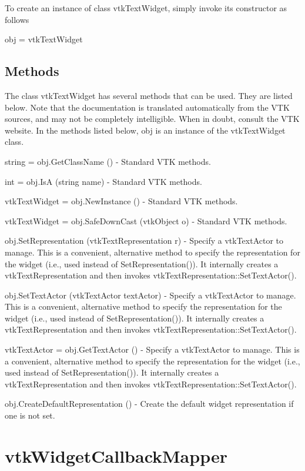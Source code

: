 To create an instance of class vtk\-Text\-Widget, simply invoke its constructor as follows \begin{DoxyVerb}  obj = vtkTextWidget
\end{DoxyVerb}
 \hypertarget{vtkwidgets_vtkxyplotwidget_Methods}{}\subsection{Methods}\label{vtkwidgets_vtkxyplotwidget_Methods}
The class vtk\-Text\-Widget has several methods that can be used. They are listed below. Note that the documentation is translated automatically from the V\-T\-K sources, and may not be completely intelligible. When in doubt, consult the V\-T\-K website. In the methods listed below, {\ttfamily obj} is an instance of the vtk\-Text\-Widget class. 
\begin{DoxyItemize}
\item {\ttfamily string = obj.\-Get\-Class\-Name ()} -\/ Standard V\-T\-K methods.  
\item {\ttfamily int = obj.\-Is\-A (string name)} -\/ Standard V\-T\-K methods.  
\item {\ttfamily vtk\-Text\-Widget = obj.\-New\-Instance ()} -\/ Standard V\-T\-K methods.  
\item {\ttfamily vtk\-Text\-Widget = obj.\-Safe\-Down\-Cast (vtk\-Object o)} -\/ Standard V\-T\-K methods.  
\item {\ttfamily obj.\-Set\-Representation (vtk\-Text\-Representation r)} -\/ Specify a vtk\-Text\-Actor to manage. This is a convenient, alternative method to specify the representation for the widget (i.\-e., used instead of Set\-Representation()). It internally creates a vtk\-Text\-Representation and then invokes vtk\-Text\-Representation\-::\-Set\-Text\-Actor().  
\item {\ttfamily obj.\-Set\-Text\-Actor (vtk\-Text\-Actor text\-Actor)} -\/ Specify a vtk\-Text\-Actor to manage. This is a convenient, alternative method to specify the representation for the widget (i.\-e., used instead of Set\-Representation()). It internally creates a vtk\-Text\-Representation and then invokes vtk\-Text\-Representation\-::\-Set\-Text\-Actor().  
\item {\ttfamily vtk\-Text\-Actor = obj.\-Get\-Text\-Actor ()} -\/ Specify a vtk\-Text\-Actor to manage. This is a convenient, alternative method to specify the representation for the widget (i.\-e., used instead of Set\-Representation()). It internally creates a vtk\-Text\-Representation and then invokes vtk\-Text\-Representation\-::\-Set\-Text\-Actor().  
\item {\ttfamily obj.\-Create\-Default\-Representation ()} -\/ Create the default widget representation if one is not set.  
\end{DoxyItemize}\hypertarget{vtkwidgets_vtkwidgetcallbackmapper}{}\section{vtk\-Widget\-Callback\-Mapper}\label{vtkwidgets_vtkwidgetcallbackmapper}
